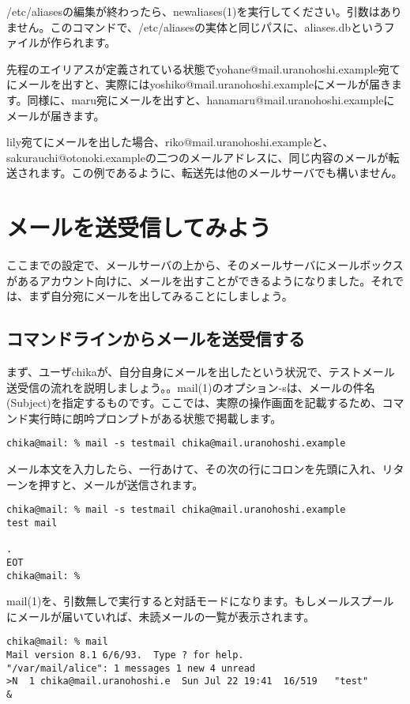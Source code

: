 /etc/aliasesの編集が終わったら、newaliases(1)を実行してください。引数はありません。このコマンドで、/etc/aliasesの実体と同じパスに、aliases.dbというファイルが作られます。

先程のエイリアスが定義されている状態でyohane@mail.uranohoshi.example宛てにメールを出すと、実際にはyoshiko@mail.uranohoshi.exampleにメールが届きます。同様に、maru宛にメールを出すと、hanamaru@mail.uranohoshi.exampleにメールが届きます。

lily宛てにメールを出した場合、riko@mail.uranohoshi.exampleと、sakurauchi@otonoki.exampleの二つのメールアドレスに、同じ内容のメールが転送されます。この例であるように、転送先は他のメールサーバでも構いません。

\section{メールを送受信してみよう}
ここまでの設定で、メールサーバの上から、そのメールサーバにメールボックスがあるアカウント向けに、メールを出すことができるようになりました。それでは、まず自分宛にメールを出してみることにしましょう。

\subsection{コマンドラインからメールを送受信する}

まず、ユーザchikaが、自分自身にメールを出したという状況で、テストメール送受信の流れを説明しましょう。。mail(1)のオプション-sは、メールの件名(Subject)を指定するものです。ここでは、実際の操作画面を記載するため、コマンド実行時に朗吟プロンプトがある状態で掲載します。

\begin{verbatim}
chika@mail: % mail -s testmail chika@mail.uranohoshi.example
\end{verbatim}

メール本文を入力したら、一行あけて、その次の行にコロンを先頭に入れ、リターンを押すと、メールが送信されます。

\begin{verbatim}
chika@mail: % mail -s testmail chika@mail.uranohoshi.example
test mail

.
EOT
chika@mail: % 
\end{verbatim}

mail(1)を、引数無しで実行すると対話モードになります。もしメールスプールにメールが届いていれば、未読メールの一覧が表示されます。

\begin{verbatim}
chika@mail: % mail
Mail version 8.1 6/6/93.  Type ? for help.
"/var/mail/alice": 1 messages 1 new 4 unread
>N  1 chika@mail.uranohoshi.e  Sun Jul 22 19:41  16/519   "test"
&
\end{verbatim}

